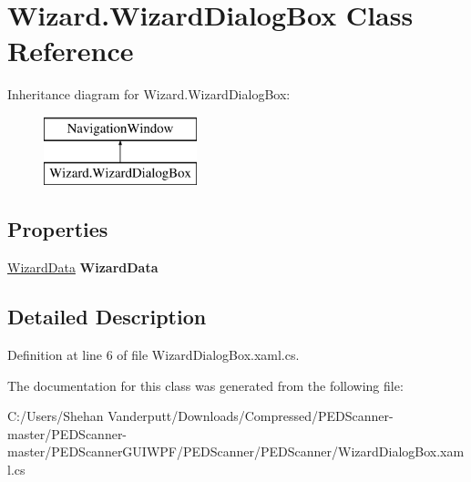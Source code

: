\hypertarget{class_wizard_1_1_wizard_dialog_box}{}\section{Wizard.\+Wizard\+Dialog\+Box Class Reference}
\label{class_wizard_1_1_wizard_dialog_box}
Inheritance diagram for Wizard.\+Wizard\+Dialog\+Box\+:\begin{figure}[H]
\begin{center}
\leavevmode
\includegraphics[height=2.000000cm]{class_wizard_1_1_wizard_dialog_box}
\end{center}
\end{figure}
\subsection*{Properties}
\begin{DoxyCompactItemize}
\item 
\mbox{\label{class_wizard_1_1_wizard_dialog_box_a3fd28ae9e2a049e9ac0966bf1c829879}} 
\mbox{\hyperlink{class_wizard_1_1_wizard_data}{Wizard\+Data}} {\bfseries Wizard\+Data}
\end{DoxyCompactItemize}


\subsection{Detailed Description}


Definition at line 6 of file Wizard\+Dialog\+Box.\+xaml.\+cs.



The documentation for this class was generated from the following file\+:\begin{DoxyCompactItemize}
\item 
C\+:/\+Users/\+Shehan Vanderputt/\+Downloads/\+Compressed/\+P\+E\+D\+Scanner-\/master/\+P\+E\+D\+Scanner-\/master/\+P\+E\+D\+Scanner\+G\+U\+I\+W\+P\+F/\+P\+E\+D\+Scanner/\+P\+E\+D\+Scanner/Wizard\+Dialog\+Box.\+xaml.\+cs\end{DoxyCompactItemize}
